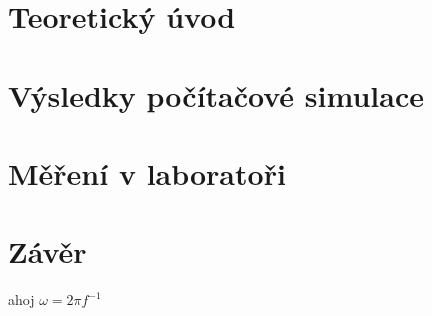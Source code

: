 \documentclass{protokol}
\begin{document}
	\maketitle

	\section{Teoretický úvod}
		
		
	\newpage
	\section{Výsledky počítačové simulace}
		

	\newpage
	\section{Měření v laboratoři}
		
		
		
	\clearpage
	\section{Závěr}
		ahoj \(\omega =2\pi f^{-1} \) 
\end{document}
